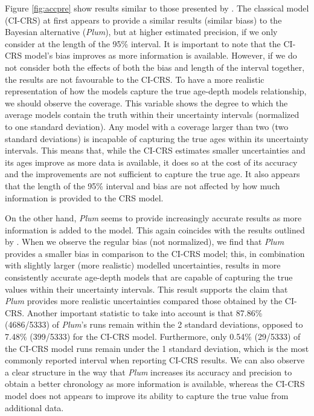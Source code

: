 \documentclass [10pt] {article}
\begin{document}
Figure \ref{fig:accpre} show results similar to those presented by \citet{Blaauw2018}. 
The classical model (CI-CRS) at first appears to provide a similar results (similar biass) to the Bayesian alternative (\textit{Plum}), but at higher estimated precision, if we only consider at the length of the 95\% interval. 
It is important to note that the CI-CRS model's bias improves as more information is available.
However, if we do not consider both the effects of both the bias and length of the interval together, the results are not favourable to the CI-CRS. 
To have a more realistic representation of how the models capture the true age-depth models relationship, we should observe the coverage. 
This variable shows the degree to which the average models contain the truth within their uncertainty intervals (normalized to one standard deviation). 
Any model with a coverage larger than two (two standard deviations) is incapable of capturing the true ages within its uncertainty intervals.  
This means that, while the CI-CRS estimates smaller uncertainties and its ages improve as more data is available, it does so at the cost of its accuracy and the improvements are not sufficient to capture the true age.
It also appears that the length of the 95\% interval and bias are not affected by how much information is provided to the CRS model. 

On the other hand, \textit{Plum} seems to provide increasingly accurate results as more information is added to the model.
This again coincides with the results outlined by \citet{Blaauw2018}. 
When we observe the regular bias (not normalized), we find that \textit{Plum} provides a smaller bias in comparison to the CI-CRS model; this, in combination with slightly larger (more realistic) modelled uncertainties, results in more consistently accurate age-depth models that are capable of capturing the true values within their uncertainty intervals. 
This result supports the claim that \textit{Plum} provides more realistic uncertainties compared those obtained by the CI-CRS. 
Another important statistic to take into account is that 87.86\% (4686/5333) of \textit{Plum}'s runs remain within the 2 standard deviations, opposed to 7.48\% (399/5333) for the CI-CRS model. Furthermore, only 0.54\% (29/5333) of the CI-CRS model runs remain under the 1 standard deviation, which is the most commonly reported interval when reporting CI-CRS results.
We can also observe a clear structure in the way that \textit{Plum} increases its accuracy and precision to obtain a better chronology as more information is available, whereas the CI-CRS model does not appears to improve its ability to capture the true value from additional data. 
\end{document}
